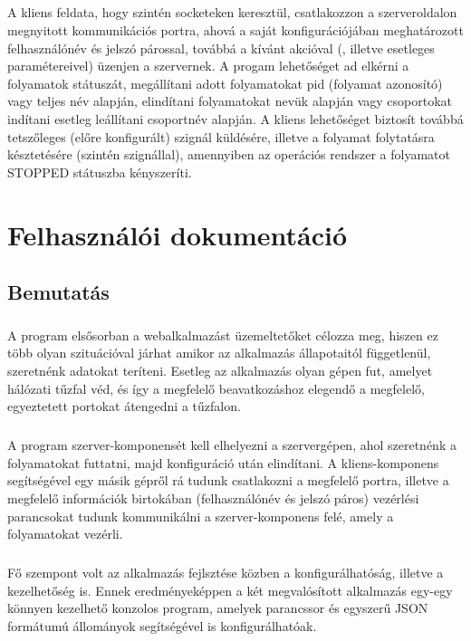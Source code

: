 \documentclass[12pt]{report}
\begin{document}
\paragraph{}
A kliens feldata, hogy szintén socketeken keresztül, csatlakozzon a szerveroldalon megnyitott kommunikációs portra, ahová a saját konfigurációjában meghatározott felhasználónév és jelszó párossal, továbbá a kívánt akcióval (, illetve esetleges paramétereivel) üzenjen a szervernek. A progam lehetőséget ad elkérni a folyamatok státuszát, megállítani adott folyamatokat pid (folyamat azonosító) vagy teljes név alapján, elindítani folyamatokat nevük alapján vagy csoportokat indítani esetleg leállítani csoportnév alapján. A kliens lehetőséget biztosít továbbá tetszőleges (előre konfigurált) szignál küldésére, illetve a folyamat folytatásra késztetésére (szintén szignállal), amennyiben az operációs rendszer a folyamatot STOPPED státuszba kényszeríti.

\chapter{Felhasználói dokumentáció}
\section{Bemutatás}
\paragraph{}
A program elsősorban a webalkalmazást üzemeltetőket célozza meg, hiszen ez több olyan szituációval járhat amikor az alkalmazás állapotaitól függetlenül, szeretnénk adatokat teríteni. Esetleg az alkalmazás olyan gépen fut, amelyet hálózati tűzfal véd, és így a megfelelő beavatkozáshoz elegendő a megfelelő, egyeztetett portokat átengedni a tűzfalon.
\paragraph{}
A program szerver-komponensét kell elhelyezni a szervergépen, ahol szeretnénk a folyamatokat futtatni, majd konfiguráció után elindítani. A kliens-komponens segítségével egy másik gépről rá tudunk csatlakozni a megfelelő portra, illetve a megfelelő információk birtokában (felhasználónév és jelszó páros) vezérlési parancsokat tudunk kommunikálni a szerver-komponens felé, amely a folyamatokat vezérli.
\paragraph{}
Fő szempont volt az alkalmazás fejlsztése közben a konfigurálhatóság, illetve a kezelhetőség is. Ennek eredményeképpen a két megvalósított alkalmazás egy-egy könnyen kezelhető konzolos program, amelyek parancssor és egyszerű JSON formátumú állományok segítségével is konfigurálhatóak.
\end{document}
